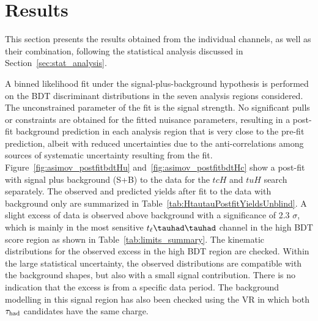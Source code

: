 \section{Results}
\label{sec:result}

This section presents the results obtained from the individual channels, as well as their combination,
following the statistical analysis discussed in Section~\ref{sec:stat_analysis}.

A binned likelihood fit under the signal-plus-background hypothesis is performed on the BDT discriminant distributions in the seven 
analysis regions considered. The unconstrained parameter of the fit is the signal strength.
No significant pulls or constraints are obtained for the fitted nuisance parameters, resulting in a post-fit background prediction in each analysis region that is
very close to the pre-fit prediction, albeit with reduced uncertainties due to the anti-correlations among sources of systematic uncertainty resulting from the fit.
Figure~\ref{fig:asimov_postfitbdtHu} and~\ref{fig:asimov_postfitbdtHc} show a post-fit with signal plus background (S+B) to the data for
the $tcH$ and $tuH$ search separately.
The observed and predicted yields after fit to the data with background only are summarized in Table~\ref{tab:HtautauPostfitYieldsUnblind}.
A slight excess of data is observed above background with a significance of 2.3 $\sigma$, which is mainly in the most sensitive $t_{\ell}\thadhad$ channel in the high BDT score region as shown in
Table~\ref{tab:limits_summary}.
The kinematic distributions for the observed excess in
the high BDT region are checked. Within the large statistical uncertainty, the observed distributions are compatible with the background shapes, but also with a small signal contribution. There is no indication that the excess is from a specific data period.
The background modelling in this signal region has also been checked using the VR in which both $\tau_\text{had}$ candidates have the same charge.
